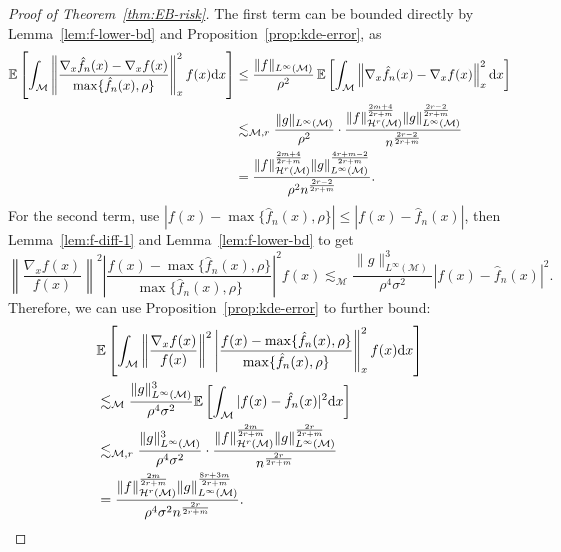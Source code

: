 \documentclass[preprint]{imsart}
\theoremstyle{plain}
\theoremstyle{definition}
\newcommand{\Ebb}{\mathbb{E}}
\newcommand{\Mcal}{\mathcal{M}}
\newcommand{\Hcal}{\mathcal{H}}
\newcommand{\diff}{\textnormal{d}}
\begin{document}
\begin{appendix}
\begin{proof}[Proof of Theorem~\ref{thm:EB-risk}]
    The first term can be bounded directly by Lemma~\ref{lem:f-lower-bd} and Proposition~\ref{prop:kde-error}, as
    \begin{equation}\label{eqn:EB-2-new}
    \begin{split}
        \Ebb\left[\int_{\Mcal}\left\|\frac{\nabla_x\hat{f}_n(x)-\nabla_xf(x)}{\max\{\hat{f}_n(x),\rho\}}\right\|_{x}^2f(x)\diff x\right] &\le \frac{\|f\|_{L^{\infty}(\Mcal)}}{\rho^2}\,\Ebb\left[\int_{\Mcal}\left\|\nabla_x\hat{f}_n(x)-\nabla_xf(x)\right\|^2_x\diff x\right] \\
        &\lesssim_{\Mcal,r} \frac{\|g\|_{L^{\infty}(\Mcal)}}{\rho^2}\cdot\frac{\|f\|_{\Hcal^{r}(\Mcal)}^{\frac{2m+4}{2r+m}}\|g\|_{L^{\infty}(\Mcal)}^{\frac{2r-2}{2r+m}}}{n^{\frac{2r-2}{2r+m}}} \\
        &= \frac{\|f\|_{\Hcal^{r}(\Mcal)}^{\frac{2m+4}{2r+m}}\|g\|_{L^{\infty}(\Mcal)}^{\frac{4r+m-2}{2r+m}}}{\rho^2n^{\frac{2r-2}{2r+m}}}. \\
        \end{split}
    \end{equation}
    For the second term, use $|f(x)-\max\{\hat{f}_n(x),\rho\}|\le|f(x)-\hat{f}_n(x)|$, then Lemma~\ref{lem:f-diff-1} and Lemma~\ref{lem:f-lower-bd} to get
    \begin{equation*}
        \left\|\frac{\nabla_x f(x)}{f(x)}\right\|^2\left|\frac{f(x) - \max\{\hat{f}_n(x),\rho\}}{\max\{\hat{f}_n(x),\rho\}}\right|^2f(x) \lesssim_{\Mcal} \frac{\|g\|^3_{L^{\infty}(\Mcal)}}{\rho^4\sigma^2}|f(x)-\hat{f}_n(x)|^2.
    \end{equation*}
    Therefore, we can use Proposition~\ref{prop:kde-error} to further bound:
    \begin{equation}\label{eqn:EB-3-new}
        \begin{split}
        &\Ebb\left[\int_{\Mcal}\left\|\frac{\nabla_x f(x)}{f(x)}\right\|^2\left|\frac{f(x) - \max\{\hat{f}_n(x),\rho\}}{\max\{\hat{f}_n(x),\rho\}}\right\|^2_{x}f(x)\diff x\right] \\
        &\lesssim_{\Mcal} \frac{\|g\|^3_{L^{\infty}(\Mcal)}}{\rho^4\sigma^2}\Ebb\left[\int_{\Mcal}|f(x)-\hat{f}_n(x)|^2\diff x\right] \\
        &\lesssim_{\Mcal,r} \frac{\|g\|^3_{L^{\infty}(\Mcal)}}{\rho^4\sigma^2}\cdot \frac{\|f\|_{\Hcal^{r}(\Mcal)}^{\frac{2m}{2r+m}}\|g\|_{L^{\infty}(\Mcal)}^{\frac{2r}{2r+m}}}{n^{\frac{2r}{2r+m}}} \\
        &= \frac{\|f\|^{\frac{2m}{2r+m}}_{\Hcal^{r}(\Mcal)}\|g\|^{\frac{8r+3m}{2r+m}}_{L^{\infty}(\Mcal)}}{\rho^4\sigma^2n^{\frac{2r}{2r+m}}}.

\end{split}
\end{equation}
\end{proof}
\end{appendix}
\end{document}
